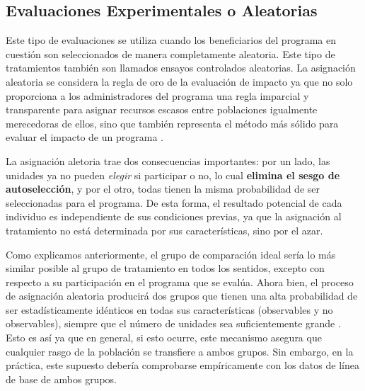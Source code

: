 \documentclass[../../main.tex]{subfiles}
\begin{document}
\subsection{Evaluaciones Experimentales o Aleatorias}
Este tipo de evaluaciones se utiliza cuando los beneficiarios del programa en cuestión son
seleccionados de manera completamente aleatoria\footnotemark. Este tipo de tratamientos
también son llamados ensayos controlados aleatorias. La asignación aleatoria se considera
la regla de oro de la evaluación de impacto ya que no solo proporciona a los
administradores del programa una regla imparcial y transparente para asignar recursos
escasos entre poblaciones igualmente merecedoras de ellos, sino que también representa el
método más sólido para evaluar el impacto de un programa \cite{gertler-2016}.

La asignación aletoria trae dos consecuencias importantes: por un lado, las unidades ya no
pueden \textit{elegir} si participar o no, lo cual \textbf{elimina el sesgo de autoselección}, y
por el otro, todas tienen la misma probabilidad de ser seleccionadas para el programa. De
esta forma, el resultado potencial de cada individuo es independiente de sus condiciones
previas, ya que la asignación al tratamiento no está determinada por sus características,
sino por el azar.

Como explicamos anteriormente, el grupo de comparación ideal sería lo más similar posible
al grupo de tratamiento en todos los sentidos, excepto con respecto a su participación en
el programa que se evalúa. Ahora bien, el proceso de asignación aleatoria producirá dos
grupos que tienen una alta probabilidad de ser estadísticamente idénticos en todas sus
características (observables y no observables), siempre que el número de unidades sea
suficientemente grande \cite{gertler-2016}. Esto es así ya que en general, si esto ocurre,
este mecanismo asegura que cualquier rasgo de la población se transfiere a ambos grupos.
Sin embargo, en la práctica, este supuesto debería comprobarse empíricamente con los datos
de línea de base de ambos grupos.
\end{document}
